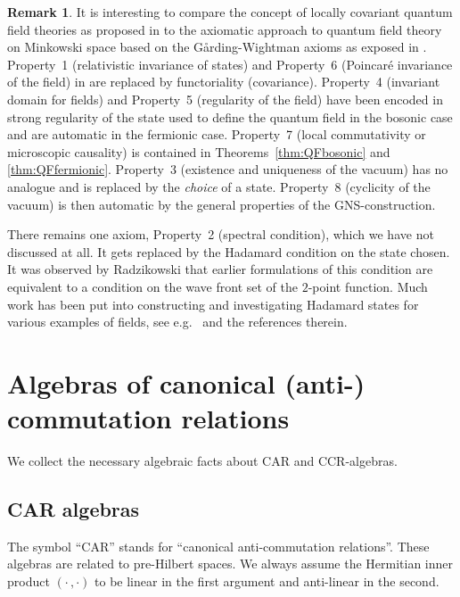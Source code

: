 \documentclass[a4paper,11pt]{amsart}
\theoremstyle{definition}
\newtheorem{rem}[thm]{Remark}
\begin{document}
\begin{rem}
It is interesting to compare the concept of locally covariant quantum field theories as proposed in \cite{BFV} to the axiomatic approach to quantum field theory on Minkowski space based on the G\r{a}rding-Wightman axioms as exposed in \cite[Sec.~IX.8]{RS2}.
Property~1 (relativistic invariance of states) and Property~6 (Poincar\'e invariance of the field) in \cite{RS2} are replaced by functoriality (covariance). 
Property~4 (invariant domain for fields) and Property~5 (regularity of the field) have been encoded in strong regularity of the state used to define the quantum field in the bosonic case and are automatic in the fermionic case.
Property~7 (local commutativity or microscopic causality) is contained in Theorems~\ref{thm:QFbosonic} and \ref{thm:QFfermionic}.
Property~3 (existence and uniqueness of the vacuum) has no analogue and is replaced by the \emph{choice} of a state.
Property~8 (cyclicity of the vacuum) is then automatic by the general properties of the GNS-construction.

There remains one axiom, Property~2 (spectral condition), which we have not discussed at all.
It gets replaced by the Hadamard condition on the state chosen.
It was observed by Radzikowski \cite{Rad} that earlier formulations of this condition are equivalent to a condition on the wave front set of the $2$-point function.
Much work has been put into constructing and investigating Hadamard states for various examples of fields, see e.g.\ \cite{DMP,DPP,FewVerch,HollWald,SV1,SV2,S,Wald} and the references therein.
\end{rem}

\appendix
\section{Algebras of canonical (anti-) commutation relations}

We collect the necessary algebraic facts about CAR and CCR-algebras.

\subsection{CAR algebras}\label{s:appendixCAR}
The symbol ``CAR'' stands for ``canonical anti-commutation relations''.
These algebras are related to pre-Hilbert spaces.
We always assume the Hermitian inner product $(\cdot\,,\cdot)$ to be linear in the first argument and anti-linear in the second.
\end{document}
